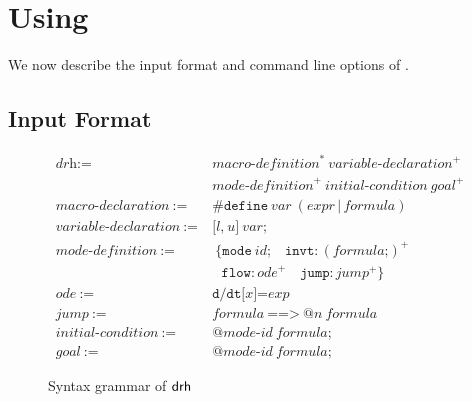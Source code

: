 \section{Using \dReach{}}\label{sec:using-dreach}


We now describe the input format and command line options of \dReach{}.

\subsection{Input Format}\label{sec:input-format}

\begin{figure}
  \begin{framed}
    \begin{align*}
      \textit{drh} := \ & \textit{macro-definition}^* \ \textit{variable-declaration}^+ \\
                        & \textit{mode-definition}^+ \  \textit{initial-condition} \  \textit{goal}^+\\
      \textit{macro-declaration} \ := \ &  \texttt{\#define} \ \textit{var} \ (\textit{expr} \, | \, \textit{formula})\\
      \textit{variable-declaration} \ := \ &  \texttt{[}
                                              \textit{l}
                                              \texttt{,}
                                              \ \textit{u}
                                              \texttt{]}
                                              \ \textit{var}
                                              \texttt{;}\\
      \textit{mode-definition} \ := \ & \ \texttt{\{}
                                         \texttt{mode} \
                                         \textit{id}\texttt{;} \quad
                                         \texttt{invt}:(\textit{formula} \texttt{;})^+\\
                                    & \ \ \ \texttt{flow}:\textit{ode}^+ \quad
                                    \texttt{jump}:\textit{jump}^+ \texttt{\}}\\
      \textit{ode} \ := \ & \texttt{d/dt[}\textit{x}\texttt{]=}\textit{exp}\\
      \textit{jump} \ := \ & \textit{formula} \ \texttt{==>} \ \texttt{@}\textit{n} \ \textit{formula}\\
      \textit{initial-condition} \ := \ & \texttt{@}\textit{mode-id} \ \textit{formula}\texttt{;}\\
      \textit{goal}              \ := \ & \texttt{@}\textit{mode-id} \ \textit{formula}\texttt{;}
    \end{align*}
  \end{framed}
  \caption{Syntax grammar of $\textsf{drh}{}$}\label{fig:drh-grammar}
\end{figure}

